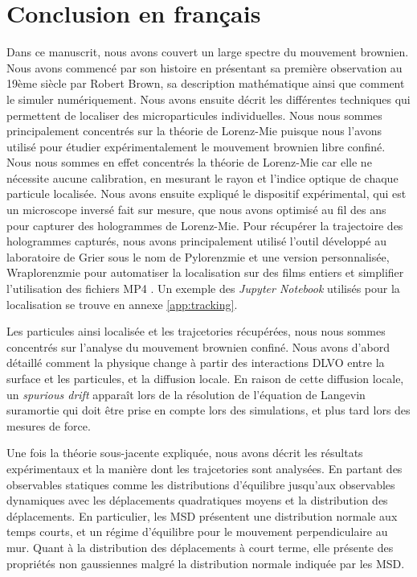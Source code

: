 \section{Conclusion en français}

Dans ce manuscrit, nous avons couvert un large spectre du mouvement brownien. Nous avons commencé par son histoire en présentant sa première observation au 19ème siècle par Robert Brown, sa description mathématique ainsi que comment le simuler numériquement. Nous avons ensuite décrit les différentes techniques qui permettent de localiser des microparticules individuelles. Nous nous sommes principalement concentrés sur la théorie de Lorenz-Mie puisque nous l'avons utilisé pour étudier expérimentalement le mouvement brownien libre confiné. Nous nous sommes en effet concentrés la théorie de Lorenz-Mie car elle ne nécessite aucune calibration, en mesurant le rayon et l'indice optique de chaque particule localisée. Nous avons ensuite expliqué le dispositif expérimental, qui est un microscope inversé fait sur mesure, que nous avons optimisé au fil des ans pour capturer des hologrammes de Lorenz-Mie. Pour récupérer la trajectoire des hologrammes capturés, nous avons principalement utilisé l'outil développé au laboratoire de Grier sous le nom de Pylorenzmie \href{https://github.com/davidgrier/pylorenzmie}{\faGithub} et une version personnalisée, Wraplorenzmie pour automatiser la localisation sur des films entiers et simplifier l'utilisation des fichiers MP4 \href{https://github.com/eXpensia/wraplorenzmie}{\faGithub}. Un exemple des \textit{Jupyter Notebook} utilisés pour la localisation se trouve en annexe \ref{app:tracking}.

Les particules ainsi localisée et les trajcetories récupérées, nous nous sommes concentrés sur l'analyse du mouvement brownien confiné. Nous avons d'abord détaillé comment la physique change à partir des interactions DLVO entre la surface et les particules, et la diffusion locale. En raison de cette diffusion locale, un \textit{spurious drift} apparaît lors de la résolution de l'équation de Langevin suramortie qui doit être prise en compte lors des simulations, et plus tard lors des mesures de force.

Une fois la théorie sous-jacente expliquée, nous avons décrit les résultats expérimentaux et la manière dont les trajcetories sont analysées. En partant des observables statiques comme les distributions d'équilibre jusqu'aux observables dynamiques avec les déplacements quadratiques moyens et la distribution des déplacements. En particulier, les \gls{MSD} présentent une distribution normale aux temps courts, et un régime d'équilibre pour le mouvement perpendiculaire au mur. Quant à la distribution des déplacements à court terme, elle présente des propriétés non gaussiennes malgré la distribution normale indiquée par les \gls{MSD}.

